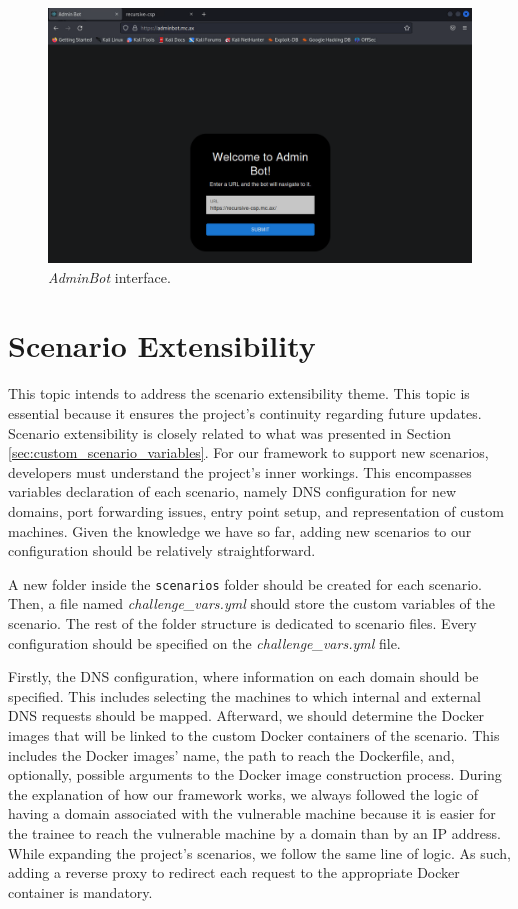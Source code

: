 \begin{figure}[H]
    \includegraphics[width=12cm]{figures/adminbot.png}
    \caption{\textit{AdminBot} interface.}
    \label{fig:admin_bot}
\end{figure}

\section{Scenario Extensibility} \label{sec:validation_scenario_extensibility}

This topic intends to address the scenario extensibility theme. This topic is essential because it ensures the project's continuity regarding future updates. Scenario extensibility is closely related to what was presented in Section \ref{sec:custom_scenario_variables}. For our framework to support new scenarios, developers must understand the project's inner workings. This encompasses variables declaration of each scenario, namely DNS configuration for new domains, port forwarding issues, entry point setup, and representation of custom machines. Given the knowledge we have so far, adding new scenarios to our configuration should be relatively straightforward. 

A new folder inside the \texttt{scenarios} folder should be created for each scenario. Then, a file named \textit{challenge\_vars.yml} should store the custom variables of the scenario. The rest of the folder structure is dedicated to scenario files. Every configuration should be specified on the \textit{challenge\_vars.yml} file.

Firstly, the DNS configuration, where information on each domain should be specified. This includes selecting the machines to which internal and external DNS requests should be mapped. Afterward, we should determine the Docker images that will be linked to the custom Docker containers of the scenario. This includes the Docker images' name, the path to reach the Dockerfile, and, optionally, possible arguments to the Docker image construction process. During the explanation of how our framework works, we always followed the logic of having a domain associated with the vulnerable machine because it is easier for the trainee to reach the vulnerable machine by a domain than by an IP address. While expanding the project's scenarios, we follow the same line of logic. As such, adding a reverse proxy to redirect each request to the appropriate Docker container is mandatory. 

